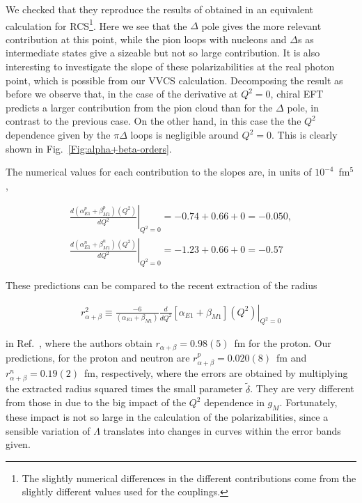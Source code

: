 \documentclass[prc,twocolumn,showpacs,preprintnumbers,amsmath,amssymb
,superscriptaddress,a4paper,nofootinbib
]{revtex4-1}
\begin{document}
We checked that they reproduce the results of \cite{Lensky:2009uv} obtained in an equivalent calculation for RCS\footnote{The slightly numerical differences in the different contributions come from the slightly different values used for the couplings.}. 
Here we see that the $\Delta$ pole gives the more relevant contribution at this point, while the pion loops with nucleons and $\Delta$s as intermediate states give a sizeable but not so large contribution. 
It is also interesting to investigate the slope of these polarizabilities at the real photon point, which is possible from our VVCS calculation. 
Decomposing the result as before we observe that, in the case of the derivative at $Q^2=0$, chiral EFT predicts a larger contribution from the pion cloud than for the $\Delta$ pole, in contrast to the previous case. 
On the other hand, in this case the the $Q^2$ dependence given by the $\pi \Delta$ loops is negligible around $Q^2=0$. 
This is clearly shown in Fig.~\ref{Fig:alpha+beta-orders}.

The numerical values for each contribution to the slopes are, in units of   $10^{-4}$~fm$^5$,


\begin{align}
\left.\frac{d(\alpha_{E1}^p + \beta_{M1}^p) (Q^2)}{dQ^2}\right|_{Q^2=0}= -0.74  + 0.66+ 0 = -0.050,\\
\left.\frac{d(\alpha_{E1}^n + \beta_{M1}^n) (Q^2)}{dQ^2}\right|_{Q^2=0}= -1.23  +0.66+ 0 =-0.57
\end{align}


These predictions can be compared to the recent extraction of the radius 

\begin{align}\label{Eq:r2alphabetaDef}
r_{\alpha+\beta}^2\equiv \frac{-6}{(\alpha_{E1}+\beta_{M1})}\left.\frac{d}{dQ^2}[\alpha_{E1}+\beta_{M1}](Q^2)\right|_{Q^2=0}
\end{align}

in Ref.~\cite{Hall:2014lea}, where the authors obtain $r_{\alpha+\beta}=0.98(5)$~fm for the proton. 
Our predictions, for the proton and neutron are $r^p_{\alpha+\beta}= 0.020(8)$~fm and $r^n_{\alpha+\beta}=0.19(2)$~fm, respectively, where the errors are obtained by multiplying the extracted radius squared times the small parameter $\tilde{\delta}$. 
They are very different from those in \cite{Hall:2014lea} due to the big impact of the $Q^2$ dependence in $g_M$.
Fortunately, these impact is not so large in the calculation of the polarizabilities, since a sensible variation of $\Lambda$ translates into changes in curves within the error bands given.
\end{document}
